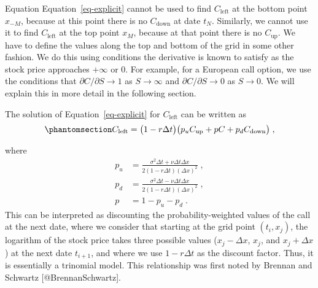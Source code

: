 \documentclass[
  letterpaper,
  DIV=11,
  numbers=noendperiod]{scrartcl}
\theoremstyle{definition}
\theoremstyle{remark}
\begin{document}
Equation Equation~\ref{eq-explicit} cannot be used to find
\(C_{\text{left}}\) at the bottom point \(x_{-M}\), because at this
point there is no \(C_{\text{down}}\) at date \(t_N\). Similarly, we
cannot use it to find \(C_{\text{left}}\) at the top point \(x_M\),
because at that point there is no \(C_{\text{up}}\). We have to define
the values along the top and bottom of the grid in some other fashion.
We do this using conditions the derivative is known to satisfy as the
stock price approaches \(+\infty\) or 0. For example, for a European
call option, we use the conditions that
\(\partial C/\partial S \rightarrow 1\) as \(S \rightarrow \infty\) and
\(\partial C/\partial S \rightarrow 0\) as \(S \rightarrow 0\). We will
explain this in more detail in the following section.

The solution of Equation~\ref{eq-explicit} for \(C_{\text{left}}\) can
be written as \begin{equation}\phantomsection\label{eq-fdtrinomial}{
C_{\text{left}} = \big(1-r\Delta t\big)\big(p_uC_{\text{up}}+pC + p_dC_{\text{down}}\big)\;,
}\end{equation}

where \begin{align*}
p_u &= \frac{\sigma^2\Delta t+\nu\Delta t\Delta x}{2(1-r\Delta t)(\Delta x)^2}\; ,\\
p_d &= \frac{\sigma^2\Delta t-\nu\Delta t\Delta x}{2(1-r\Delta t)(\Delta x)^2}\; ,\\
p &= 1- p_u-p_d\;.
\end{align*} This can be interpreted as discounting the
probability-weighted values of the call at the next date, where we
consider that starting at the grid point \((t_{i},x_j)\), the logarithm
of the stock price takes three possible values (\(x_j-\Delta x\),
\(x_j\), and \(x_j+\Delta x\)) at the next date \(t_{i+1}\), and where
we use \(1-r\Delta t\) as the discount factor. Thus, it is essentially a
trinomial model. This relationship was first
noted by Brennan and Schwartz {[}@BrennanSchwartz{]}.
\end{document}
